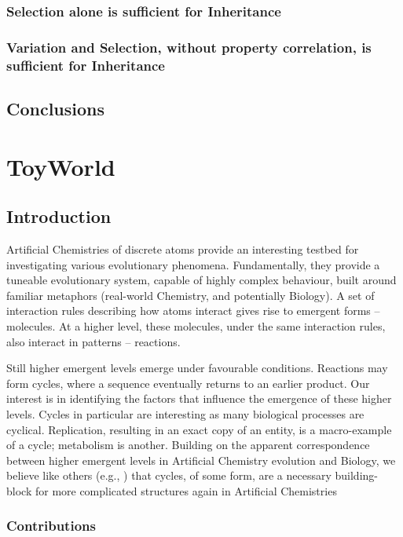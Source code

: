 \documentclass[]{report}
\begin{document}
\section{Selection alone is sufficient for Inheritance}
\section{Variation and Selection, without property correlation, is sufficient for Inheritance}

\chapter{Conclusions}

\part{ToyWorld}
\chapter{Introduction}\label{part-two}

Artificial Chemistries of discrete atoms provide an interesting testbed
for investigating various evolutionary phenomena. Fundamentally, they
provide a tuneable evolutionary system, capable of highly complex
behaviour, built around familiar metaphors (real-world Chemistry, and
potentially Biology). A set of interaction rules describing how atoms
interact gives rise to emergent forms -- molecules. At a higher level,
these molecules, under the same interaction rules, also interact in
patterns -- reactions.

Still higher emergent levels emerge under favourable conditions.
Reactions may form cycles, where a sequence eventually returns to an
earlier product. Our interest is in identifying the factors that
influence the emergence of these higher levels. Cycles in particular are
interesting as many biological processes are cyclical. Replication,
resulting in an exact copy of an entity, is a macro-example of a cycle;
metabolism is another. Building on the apparent correspondence between
higher emergent levels in Artificial Chemistry evolution and Biology, we
believe like others (e.g., \cite{Steel2013}) that cycles, of some
form, are a necessary building-block for more complicated structures
again in Artificial Chemistries

\section{Contributions}
\end{document}
